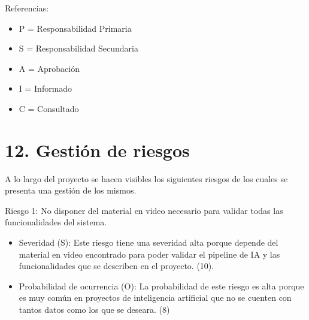 \documentclass[11pt]{charter}
\begin{document}
\begin{table}[htpb]
\centering
{}
\end{table}


Referencias:
\begin{itemize}
	\item P = Responsabilidad Primaria
	\item S = Responsabilidad Secundaria
	\item A = Aprobación
	\item I = Informado
	\item C = Consultado
\end{itemize}

\newpage

\section{12. Gestión de riesgos}
\label{sec:riesgos}

A lo largo del proyecto se hacen visibles los siguientes riesgos de los cuales se presenta una gestión
de los mismos.
 
Riesgo 1: No disponer del material en video necesario para validar todas las funcionalidades del sistema.
\begin{itemize}
\item Severidad (S): Este riesgo tiene una severidad alta porque depende del material en video encontrado para poder validar el pipeline de IA y las funcionalidades que se describen en el proyecto. (10).
\item Probabilidad de ocurrencia (O): La probabilidad de este riesgo es alta porque es muy común en proyectos de inteligencia artificial que no se cuenten con tantos datos como los que se deseara. (8)
\end{itemize}   
\end{document}
